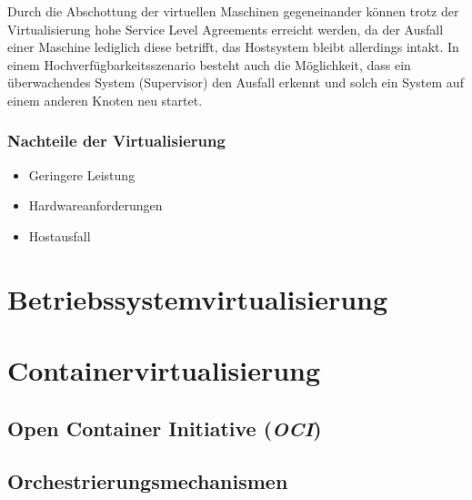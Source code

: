 Durch die Abschottung der virtuellen Maschinen gegeneinander können trotz der Virtualisierung hohe Service Level Agreements erreicht werden, da der Ausfall einer Maschine lediglich diese betrifft, das Hostsystem bleibt allerdings intakt.
In einem Hochverfügbarkeitsszenario besteht auch die Möglichkeit, dass ein überwachendes System (Supervisor) den Ausfall erkennt und solch ein System auf einem anderen Knoten neu startet.

\subsubsection{Nachteile der Virtualisierung \autocite[198]{Baun2009}}
\begin{itemize}
    \item Geringere Leistung
    \item Hardwareanforderungen
    \item Hostausfall
\end{itemize}
\section{Betriebssystemvirtualisierung}
\label{sec:betriebssystemvirtualisierung}
\section{Containervirtualisierung}
\label{sec:containervirtualisierung}
\subsection{Open Container Initiative (\emph{OCI})}
\label{sec:open-container-initiative}
\subsection{Orchestrierungsmechanismen}
\label{sec:orchestrierungsmechanismen}
